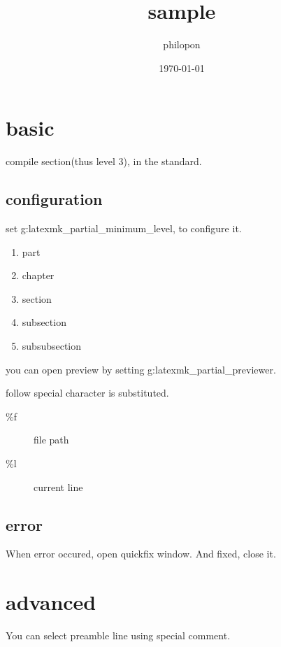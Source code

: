 \documentclass[a4j,uplatex,dvipdfmx]{jsarticle}
\title{sample}
\author{philopon}
\date{\today}
\begin{document}
\maketitle

\section{basic}

compile section(thus level 3), in the standard.

\subsection{configuration}

set g:latexmk\_partial\_minimum\_level, to configure it.

\begin{enumerate}
  \item part
  \item chapter
  \item section
  \item subsection
  \item subsubsection
\end{enumerate}

you can open preview by setting g:latexmk\_partial\_previewer.

follow special character is substituted.

\begin{description}
  \item[\%f] file path
  \item[\%l] current line
\end{description}

\subsection{error}

When error occured, open quickfix window.
And fixed, close it.


\section{advanced} %
You can select preamble line using special comment.

\begin{figure}[h]
  \centering
\end{figure}
\end{document}

